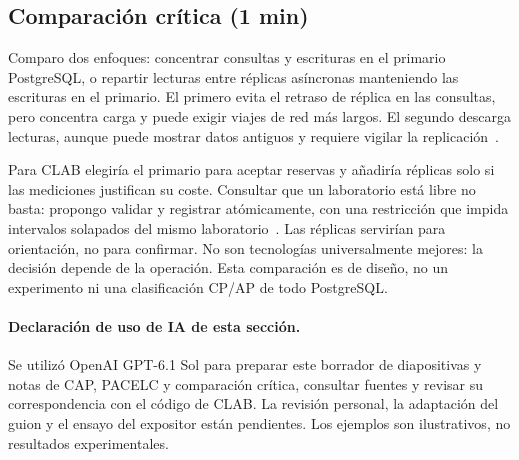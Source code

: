 \subsection*{Comparación crítica (1 min)}
Comparo dos enfoques: concentrar consultas y escrituras en el primario
PostgreSQL, o repartir lecturas entre réplicas asíncronas manteniendo las
escrituras en el primario. El primero evita el retraso de réplica en las
consultas, pero concentra carga y puede exigir viajes de red más largos.
El segundo descarga lecturas, aunque puede mostrar datos antiguos y requiere
vigilar la replicación~\cite{gsPg18Replication}.

Para CLAB elegiría el primario para aceptar reservas y añadiría réplicas solo
si las mediciones justifican su coste. Consultar que un laboratorio está libre
no basta: propongo validar y registrar atómicamente, con una restricción que
impida intervalos solapados del mismo laboratorio~\cite{gsPg18Ranges}.
Las réplicas servirían para orientación, no para confirmar. No son tecnologías
universalmente mejores: la decisión depende de la operación. Esta comparación
es de diseño, no un experimento ni una clasificación CP/AP de todo PostgreSQL.

\paragraph{Declaración de uso de IA de esta sección.}
Se utilizó OpenAI GPT-6.1 Sol para preparar este borrador de diapositivas y notas
de CAP, PACELC y comparación crítica, consultar fuentes y revisar su
correspondencia con el código de CLAB.
La revisión personal, la adaptación del guion y el ensayo del expositor están
pendientes. Los ejemplos son ilustrativos, no resultados experimentales.
